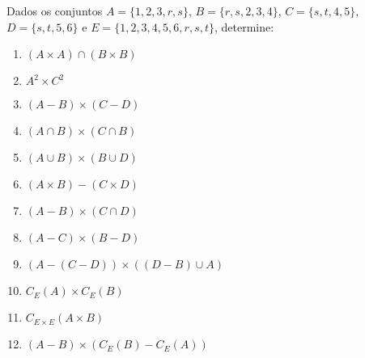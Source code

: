 \documentclass[12pt]{exam}
\begin{document}
    \questao{} Dados os conjuntos $A = \{1, 2, 3, r, s\}$, $B = \{r, s, 2, 3, 4\}$, $C = \{s, t, 4, 5\}$, $D = \{s, t, 5, 6\}$ e $E = \{1, 2, 3, 4, 5, 6, r, s, t\}$, determine:
    \begin{multicols}{2}
        \begin{enumerate}[label={\alph*})]
            \item $(A \times A) \cap (B \times B)$

            \item $A^2 \times C^2$

            \item $(A - B) \times (C - D)$

            \item $(A \cap B) \times (C \cap B)$

            \item $(A \cup B) \times (B \cup D)$

            \item $(A \times B) - (C \times D)$

            \item $(A - B) \times (C \cap D)$

            \item $(A - C) \times (B - D)$

            \item $(A - (C - D)) \times ((D - B) \cup A)$


            \item $C_E(A) \times C_E(B)$

            \item $C_{E\times E}(A \times B)$

            \item $(A - B) \times (C_E(B) - C_E(A))$
        \end{enumerate}

    \end{multicols}

    \vspace{.3cm}

\end{document}
